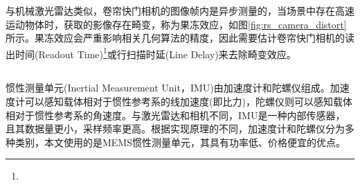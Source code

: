 与机械激光雷达类似，卷帘快门相机的图像帧内是异步测量的，当场景中存在高速运动物体时，获取的影像存在畸变，称为果冻效应，如图\ref{fig:rs_camera_distort}所示。果冻效应会严重影响相关几何算法的精度，因此需要估计卷帘快门相机的读出时间(Readout Time)\footnote{}或行扫描时延(Line Delay)来去除畸变效应。


\subsection{}
惯性测量单元(Inertial Measurement Unit，IMU)由加速度计和陀螺仪组成。加速度计可以感知载体相对于惯性参考系的线加速度(即比力)，陀螺仪则可以感知载体相对于惯性参考系的角速度。与激光雷达和相机不同，IMU是一种内部传感器，且其数据量更小，采样频率更高。根据实现原理的不同，加速度计和陀螺仪分为多种类别，本文使用的是MEMS惯性测量单元，其具有功率低、价格便宜的优点。

